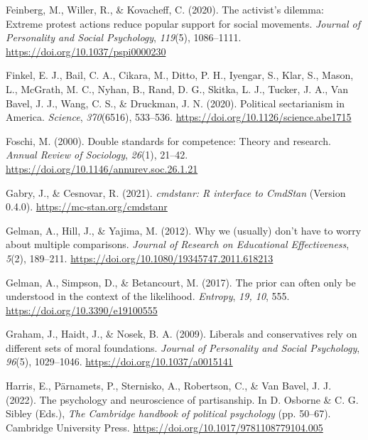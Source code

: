 \documentclass[12pt, letterpaper]{article}
\newenvironment{CSLReferences}[2]{}{}
\begin{document}
\begin{CSLReferences}{1}{0}
\leavevmode{}%
Feinberg, M., Willer, R., \& Kovacheff, C. (2020). The activist's
dilemma: {Extreme} protest actions reduce popular support for social
movements. \emph{Journal of Personality and Social Psychology},
\emph{119}(5), 1086--1111. \url{https://doi.org/10.1037/pspi0000230}

\leavevmode{}%
Finkel, E. J., Bail, C. A., Cikara, M., Ditto, P. H., Iyengar, S., Klar,
S., Mason, L., McGrath, M. C., Nyhan, B., Rand, D. G., Skitka, L. J.,
Tucker, J. A., Van Bavel, J. J., Wang, C. S., \& Druckman, J. N. (2020).
Political sectarianism in {America}. \emph{Science}, \emph{370}(6516),
533--536. \url{https://doi.org/10.1126/science.abe1715}

\leavevmode{}%
Foschi, M. (2000). Double standards for competence: Theory and research.
\emph{Annual Review of Sociology}, \emph{26}(1), 21--42.
\url{https://doi.org/10.1146/annurev.soc.26.1.21}

\leavevmode{}%
Gabry, J., \& Cesnovar, R. (2021). \emph{{cmdstanr}: {R} interface to
{CmdStan}} (Version 0.4.0). \url{https://mc-stan.org/cmdstanr}

\leavevmode{}%
Gelman, A., Hill, J., \& Yajima, M. (2012). Why we (usually) don't have
to worry about multiple comparisons. \emph{Journal of Research on
Educational Effectiveness}, \emph{5}(2), 189--211.
\url{https://doi.org/10.1080/19345747.2011.618213}

\leavevmode{}%
Gelman, A., Simpson, D., \& Betancourt, M. (2017). The prior can often
only be understood in the context of the likelihood. \emph{Entropy},
\emph{19, 10}, 555. \url{https://doi.org/10.3390/e19100555}

\leavevmode{}%
Graham, J., Haidt, J., \& Nosek, B. A. (2009). Liberals and
conservatives rely on different sets of moral foundations. \emph{Journal
of Personality and Social Psychology}, \emph{96}(5), 1029--1046.
\url{https://doi.org/10.1037/a0015141}

\leavevmode{}%
Harris, E., Pärnamets, P., Sternisko, A., Robertson, C., \& Van Bavel,
J. J. (2022). The psychology and neuroscience of partisanship. In D.
Osborne \& C. G. Sibley (Eds.), \emph{The {Cambridge} handbook of
political psychology} (pp. 50--67). Cambridge University Press.
\url{https://doi.org/10.1017/9781108779104.005}


\end{CSLReferences}
\end{document}
